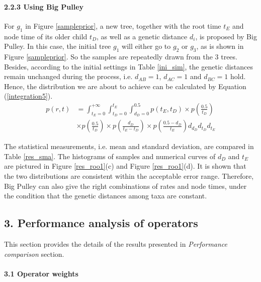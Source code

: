 \documentclass{bmcart}
\begin{document}
\begin{backmatter}
\paragraph*{2.2.3 Using Big Pulley}

For $g_1$ in Figure \ref{sampleprior}, a new tree, together with the root time $t_E$ and node time of its older child $t_D$, as well as a genetic distance $d_i$, is proposed by Big Pulley. In this case, the initial tree $g_1$ will either go to $g_2$ or $g_3$, as is shown in Figure \ref{sampleprior}.  So the samples are repeatedly drawn from the 3 trees. Besides, according to the initial settings in Table \ref{ini_sim}, the genetic distances remain unchanged during the process, i.e. $d_{AB} = 1$, $d_{AC}  = 1$ and $d_{BC} = 1$ hold. Hence, the distribution we are about to achieve can be calculated by Equation (\ref{integration5}).
\begin{equation}\label{integration5}
\begin{aligned}
p(r,t) &= \int_{{t_E} = 0}^{ + \infty } {\int_{{t_D} = 0}^{{t_E}} {\int_{{d_D} = 0}^{0.5} {p({t_E},{t_D})} } \times p(\frac{{0.5}}{{{t_D}}})}  \\&\times p(\frac{{0.5}}{{{t_D}}}) \times p(\frac{{{d_D}}}{{{t_E} - {t_D}}}) \times p(\frac{{0.5 - {d_D}}}{{{t_E}}}){d_{d_D}}{d_{t_D}}{d_{t_E}}
\end{aligned}
\end{equation}

The statistical measurements, i.e. mean and standard deviation, are compared in Table \ref{res_sma}. The histograms of samples and numerical curves of ${d_D}$ and ${t_E}$ are pictured in Figure \ref{res_roo1}(c) and Figure \ref{res_roo1}(d). It is shown that the two distributions are consistent within the acceptable error range. Therefore, Big Pulley can also give the right combinations of rates and node times, under the condition that the genetic distances among taxa are constant.

\subsection*{3. Performance analysis of operators}\label{performanceanalysis}
This section provides the details of the results presented in \textit{Performance comparison} section.

\paragraph*{3.1 Operator weights}


\end{backmatter}
\end{document}
